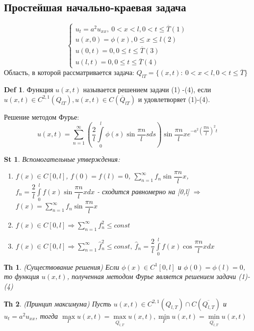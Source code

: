 \documentclass[14pt]{article}
\theoremstyle{plain}
\newtheorem{Thm}{Тh}
\newtheorem{St}{St}
\theoremstyle{definition}
\newtheorem{Def}{Def}
\begin{document}
	\subsection{Простейшая начально-краевая задача}
		\begin{equation*}
			\left\{ 
			\begin{array}{ll} 
				u_t = a^2 u_{xx}, \ 0 < x < l, 0 < t \leq \overline{T}  (1)\\ 
				u(x,0) = \phi(x), 0 \leq x \leq l (2) \\ 
				u(0,t) = 0,  0 \leq t\leq \overline{T} (3)\\
				u(l,t) = 0, 0 \leq t \leq \overline{T} (4)\end{array}\right.
		\end{equation*}
		Область, в которой рассматривается задача:  $Q_{lT} = \{ (x,t): \ 0 < x < l, 0 < t \leq \overline{T}\}$
		\begin{Def}
			Функция $u(x,t)$ называется решением задачи (1) -(4), если $u(x,t) \in C^{2,1} (Q_{lT}), u(x,t) \in C(\overline{Q}_{lT})$ и удовлетворяет (1)-(4). 	
		\end{Def}
		Решение методом Фурье:
		$$
			u(x,t) = \sum\limits_{n=1}^{\infty} \left(\dfrac{2}{l} \int\limits_0^{l} \phi(s) \sin{\dfrac{\pi n}{l} s} ds \right) \sin{\dfrac{\pi n}{l} x} e^{-a^2 (\dfrac{\pi n}{l})^2 t}
		$$
		\begin{St}
			Вспомогательные утверждения:
			\begin{enumerate}
				\item $f(x) \in C[0,l]$, $f(0) = f(l) = 0$, $\sum\limits_{n=1}^{\infty} f_n \sin{\dfrac{\pi n}{l} x}$, $f_n = \dfrac{2}{l} \int\limits_0^l f(x) \sin{\dfrac{\pi n}{l} x} dx$ - сходится равномерно на [0,l] $\Rightarrow$ $f(x) = \sum\limits_{n=1}^{\infty} f_n \sin{\dfrac{\pi n}{l} x}$
				\item $f(x) \in C[0,l] \Rightarrow \sum\limits_{n=1}^{\infty} f^2_n \leq const$ 
				\item $f(x) \in C[0,l] \Rightarrow \sum\limits_{n=1}^{\infty} \hat{f}^2_n \leq const, \ \hat{f}_n = \dfrac{2}{l} \int\limits_0^l f(x) \cos{\dfrac{\pi n}{l} x} dx$
			\end{enumerate}
		\end{St}
		\begin{Thm}
			(Существование решения) \newline
			Если $\phi(x) \in C^1 [0,l]$ и $\phi(0) = \phi(l) = 0$, то функция $u(x,t)$, полученная методом Фурье является решением задачи (1)-(4)
		\end{Thm}
		\begin{Thm}
			(Принцип максимума) \newline
			Пусть $u(x,t) \in C^{2,1} (Q_{l, T}) \cap C(\overline{Q_{l,T}})$ и $u_t = a^2 u_{xx}$, тогда $\max\limits_{\Gamma} u(x,t) = \max\limits_{\overline{Q_{l,T}}} u(x,t), 	\min\limits_{\Gamma} u(x,t) = \min\limits_{\overline{Q_{l,T}}} u(x,t)$
		\end{Thm}
\end{document}
